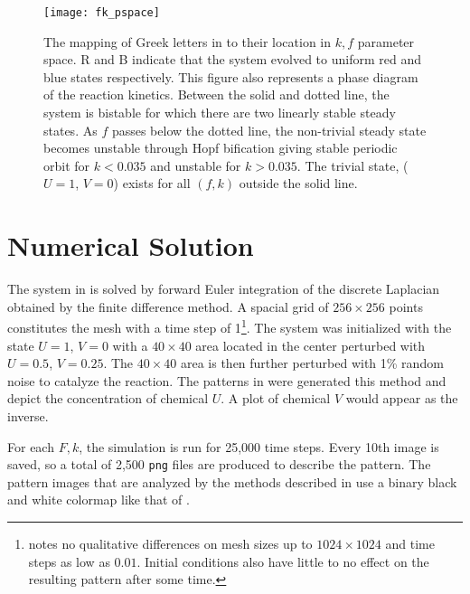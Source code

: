 \begin{figure}[h]
\begin{center}
\texttt{[image: fk\_pspace]}
\caption{\label{fig:fk_pspace} The mapping of Greek letters in  to their location in $k,f$ parameter space. R and B indicate that the system evolved to uniform red and blue states respectively. This figure also represents a phase diagram of the reaction kinetics. Between the solid and dotted line, the system is bistable for which there are two linearly stable steady states. As $f$ passes below the dotted line, the non-trivial steady state becomes unstable through Hopf bification giving stable periodic orbit for $k < 0.035$ and unstable for $k > 0.035$. The trivial state, ($U =1$, $V = 0$) exists for all $(f,k)$ outside the solid line.}
\end{center}
\end{figure}

\section{Numerical Solution} \label{ch1:gs-simulation}

The system in  is solved by forward Euler integration of the discrete Laplacian obtained by the finite difference method. A spacial grid of $256 \times 256$ points constitutes the mesh with a time step of 1\footnote{ notes no qualitative differences on mesh sizes up to $1024 \times 1024$ and time steps as low as $0.01$. Initial conditions also have little to no effect on the resulting pattern after some time.}. The system was initialized with the state $U=1$, $V=0$ with a $40 \times 40$ area located in the center perturbed with $U=0.5$, $V=0.25$. The $40 \times 40$ area is then further perturbed with 1\% random noise to catalyze the reaction. The patterns in  were generated this method and depict the concentration of chemical $U$. A plot of chemical $V$ would appear as the inverse. 

For each $F, k$, the simulation is run for 25,000 time steps. Every 10th image is saved, so a total of 2,500 \texttt{png} files are produced to describe the pattern. The pattern images that are analyzed by the methods described in  use a binary black and white colormap like that of .



